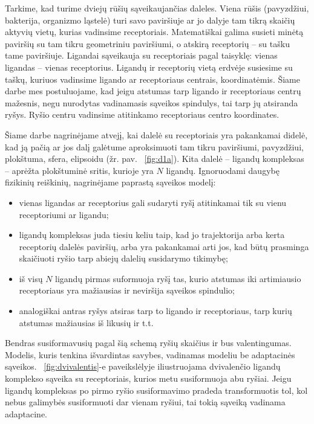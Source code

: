 \documentclass[10pt]{article}
\begin{document}
Tarkime, kad turime dviejų rūšių sąveikaujančias daleles. Viena rūšis (pavyzdžiui, bakterija, organizmo ląstelė) turi savo paviršiuje ar jo dalyje tam tikrą skaičių aktyvių vietų, kurias  vadinsime receptoriais. Matematiškai galima susieti minėtą paviršių su tam tikru geometriniu paviršiumi, o atskirą receptorių --  su tašku tame paviršiuje. Ligandai  sąveikauja su receptoriais pagal taisyklę: vienas ligandas -- vienas receptorius.  Ligandų ir receptorių vietą erdvėje susiesime su taškų, kuriuos vadinsime ligando ar receptoriaus centrais, koordinatėmis. Šiame darbe mes postuluojame, kad jeigu atstumas tarp ligando ir receptoriaus centrų mažesnis, negu nurodytas vadinamasis sąveikos spindulys, tai tarp jų atsiranda ryšys. Ryšio centru vadinsime atitinkamo receptoriaus centro koordinates.


Šiame darbe  nagrinėjame atvejį, kai dalelė su receptoriais yra pakankamai didelė, kad  ją pačią  ar  jos dalį   galėtume aproksimuoti tam tikru paviršiumi, pavyzdžiui,  plokštuma, sfera, elipsoidu (žr. pav. ~\ref{fig:d1a}).  Kita dalelė – ligandų kompleksas –  aprėžta plokštuminė sritis, kurioje yra $ N $  ligandų. Ignoruodami daugybę fizikinių  reiškinių, nagrinėjame paprastą  sąveikos  modelį: 
\begin{itemize}

\item vienas ligandas ar receptorius gali sudaryti ryšį atitinkamai tik su vienu receptoriumi ar ligandu;

\item   ligandų kompleksas juda tiesiu keliu taip, kad jo trajektorija arba kerta receptorių dalelės paviršių, arba yra pakankamai arti jos, kad būtų prasminga skaičiuoti  ryšio tarp abiejų dalelių susidarymo tikimybę;

\item iš visų $N$ ligandų pirmas suformuoja ryšį tas, kurio atstumas iki artimiausio receptoriaus yra  mažiausias ir neviršija sąveikos spindulio;

\item  analogiškai antras ryšys atsiras tarp to ligando ir receptoriaus, tarp kurių atstumas mažiausias iš likusių ir t.t.  
\end{itemize}
               
           
Bendras susiformavusių pagal šią schemą ryšių skaičius  ir bus valentingumas. Modelis, kuris tenkina išvardintas savybes, vadinamas modeliu  be adaptacinės sąveikos. ~\ref{fig:dvivalentis}-e paveikslėlyje  iliustruojama dvivalenčio ligandų komplekso sąveika su receptoriais, kurios metu susiformuoja  abu ryšiai. Jeigu ligandų kompleksas po pirmo ryšio susiformavimo pradeda transformuotis tol, kol nebus galimybės susiformuoti dar vienam ryšiui, tai tokią sąveiką vadinama  adaptacine.  
          
\end{document}
